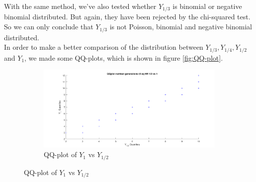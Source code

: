 With the same method, we've also tested whether $Y_{1/3}$ is binomial or negative binomial distributed. 
But again, they have been rejected by the chi-squared test. 
So we can only conclude that $Y_{1/3}$ is not Poisson, binomial and negative binomial distributed.\\

In order to make a better comparison of the distribution between $Y_{1/3},Y_{1/4},Y_{1/2}$ and $Y_1$, we made some QQ-plots, which is shown in figure \ref{fig:QQ-plot}.

\begin{figure}[H]
    \centering
    \begin{subfigure}{0.8\textwidth}
    \includegraphics[width=\textwidth]{QQplotATGEN3.pdf}
    \caption{QQ-plot of $Y_{1}$ vs $Y_{1/2}$}
        \label{fig:QQplotATGEN3}
    \end{subfigure}
    

\end{figure}
